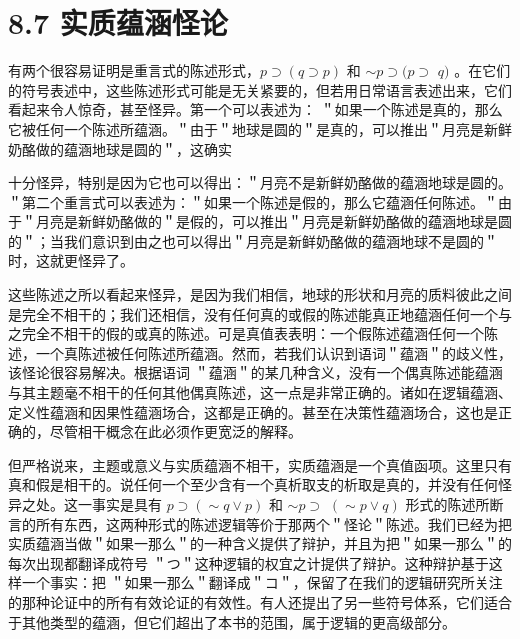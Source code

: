 \section*{8.7 实质蕴涵怪论}
有两个很容易证明是重言式的陈述形式，$p \supset(q \supset p)$ 和 $\sim p \supset(p \supset$ $q)$ 。在它们的符号表述中，这些陈述形式可能是无关紧要的，但若用日常语言表述出来，它们看起来令人惊奇，甚至怪异。第一个可以表述为： ＂如果一个陈述是真的，那么它被任何一个陈述所蕴涵。＂由于＂地球是圆的＂是真的，可以推出＂月亮是新鲜奶酪做的蕴涵地球是圆的＂，这确实

十分怪异，特别是因为它也可以得出：＂月亮不是新鲜奶酪做的蕴涵地球是圆的。＂第二个重言式可以表述为：＂如果一个陈述是假的，那么它蕴涵任何陈述。＂由于＂月亮是新鲜奶酪做的＂是假的，可以推出＂月亮是新鲜奶酪做的蕴涵地球是圆的＂；当我们意识到由之也可以得出＂月亮是新鲜奶酪做的蕴涵地球不是圆的＂时，这就更怪异了。

这些陈述之所以看起来怪异，是因为我们相信，地球的形状和月亮的质料彼此之间是完全不相干的；我们还相信，没有任何真的或假的陈述能真正地蕴涵任何一个与之完全不相干的假的或真的陈述。可是真值表表明：一个假陈述蕴涵任何一个陈述，一个真陈述被任何陈述所蕴涵。然而，若我们认识到语词＂蕴涵＂的歧义性，该怪论很容易解决。根据语词 ＂蕴涵＂的某几种含义，没有一个偶真陈述能蕴涵与其主题毫不相干的任何其他偶真陈述，这一点是非常正确的。诸如在逻辑蕴涵、定义性蕴涵和因果性蕴涵场合，这都是正确的。甚至在决策性蕴涵场合，这也是正确的，尽管相干概念在此必须作更宽泛的解释。

但严格说来，主题或意义与实质蕴涵不相干，实质蕴涵是一个真值函项。这里只有真和假是相干的。说任何一个至少含有一个真析取支的析取是真的，并没有任何怪异之处。这一事实是具有 $p \supset(\sim q \vee p)$ 和 $\sim p \supset$ $(\sim p \vee q)$ 形式的陈述所断言的所有东西，这两种形式的陈述逻辑等价于那两个＂怪论＂陈述。我们已经为把实质蕴涵当做＂如果一那么＂的一种含义提供了辩护，并且为把＂如果一那么＂的每次出现都翻译成符号 ＂つ＂这种逻辑的权宜之计提供了辩护。这种辩护基于这样一个事实：把 ＂如果一那么＂翻译成＂コ＂，保留了在我们的逻辑研究所关注的那种论证中的所有有效论证的有效性。有人还提出了另一些符号体系，它们适合于其他类型的蕴涵，但它们超出了本书的范围，属于逻辑的更高级部分。 